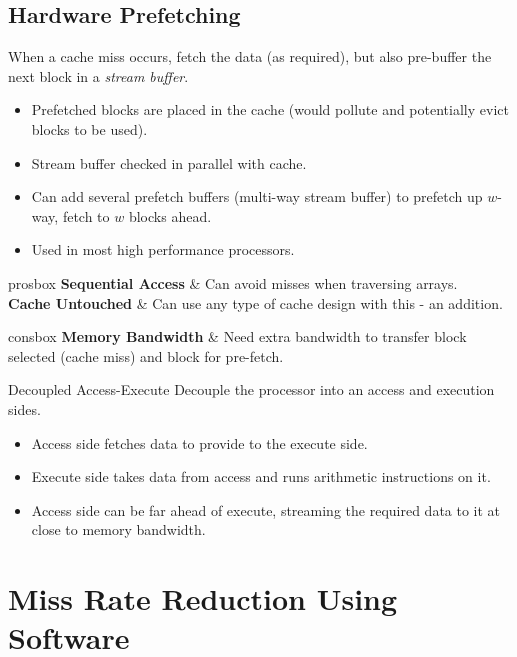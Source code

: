 \subsection{Hardware Prefetching}
When a cache miss occurs, fetch the data (as required), but also pre-buffer the next block in a \textit{stream buffer}.
\begin{itemize}
    \item Prefetched blocks are placed in the cache (would pollute and potentially evict blocks to be used).
    \item Stream buffer checked in parallel with cache.
    \item Can add several prefetch buffers (multi-way stream buffer) to prefetch up $w$-way, fetch to $w$ blocks ahead.
    \item Used in most high performance processors.
\end{itemize}

\begin{tabbox}{prosbox}
    \textbf{Sequential Access} & Can avoid misses when traversing arrays. \\
    \textbf{Cache Untouched} & Can use any type of cache design with this - an addition. \\
\end{tabbox}

\begin{tabbox}[.7\textwidth]{consbox}
    \textbf{Memory Bandwidth} & Need extra bandwidth to transfer block selected (cache miss) and block for pre-fetch. \\
\end{tabbox}

\begin{sidenotebox}{Decoupled Access-Execute}
    Decouple the processor into an access and execution sides.
\begin{itemize}
    \item Access side fetches data to provide to the execute side.
    \item Execute side takes data from access and runs arithmetic instructions on it.
    \item Access side can be far ahead of execute, streaming the required data to it at close to memory bandwidth.
\end{itemize}
\end{sidenotebox}

\section{Miss Rate Reduction Using Software}
